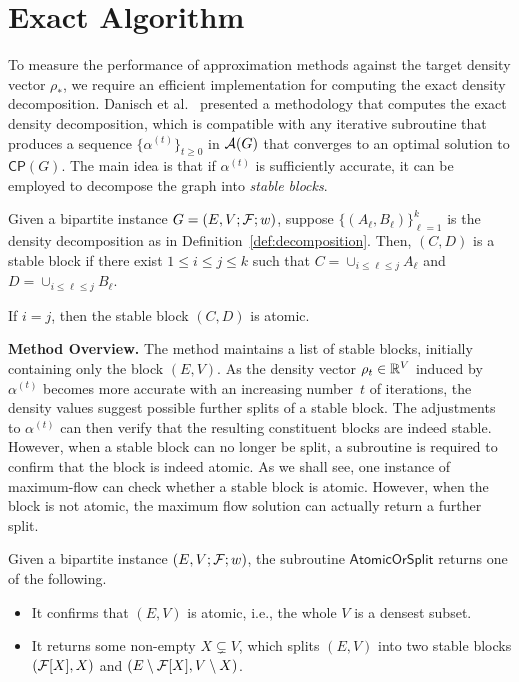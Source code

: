 \section{Exact Algorithm}
\label{sec:exact}

To measure the performance of approximation methods against the target density vector $\rho_*$, we require an efficient implementation for computing the exact density decomposition. Danisch et al.~\cite{DBLP:conf/www/DanischCS17} presented a methodology that computes the exact density decomposition, which is compatible with any iterative subroutine 
that produces a sequence $\{\alpha^{(t)}\}_{t \geq 0}$ in $\mathcal {A}(G)$
that converges to an optimal solution to $\mathsf{CP}(G)$.
The main idea is that if $\alpha^{(t)}$ is sufficiently accurate, it can be employed to decompose the graph into \emph{stable blocks}.



\begin{definition}\label{defn:stable-block}
Given a bipartite instance $G=(E, V; \mathcal {F}; w)$, suppose $\{(A_\ell, B_\ell)\}_{\ell = 1}^k$ is the density decomposition as in Definition~\ref{def:decomposition}. 
Then, $(C, D)$ is a stable block if
there exist $1 \leq i \leq j \leq k$ such that
$C = \cup_{i \leq \ell \leq j} A_\ell$
and $D = \cup_{i \leq \ell \leq j} B_\ell$.

If $i = j$, then the stable block $(C, D)$ is atomic.
\end{definition}


\noindent \textbf{Method Overview.}
The method maintains a list of stable blocks, initially containing only the block $(E, V)$. As the density vector $\rho_t \in \mathbb{R}^V$ induced by $\alpha^{(t)}$ becomes more accurate with an increasing number~$t$ of iterations, the density values suggest possible further splits of a stable block. The adjustments to $\alpha^{(t)}$ can then verify that the resulting constituent blocks are indeed stable. However, when a stable block can no longer be split, a subroutine is required to confirm that the block is indeed atomic.
As we shall see, one instance of maximum-flow can check whether a stable block is atomic. However,
when the block is not atomic, the maximum flow solution can actually return a further split.


\begin{definition}
\label{defn:atomicsplit}
Given a bipartite instance $(E, V; \mathcal {F}; w)$,
the subroutine $\mathsf{AtomicOrSplit}$ returns
one of the following.

\begin{itemize}

\item It confirms that $(E, V)$ is atomic, i.e., the whole $V$ is a densest subset.


\item It returns some non-empty $X \subsetneq V$,
which splits $(E,V)$ into two stable blocks $(\mathcal {F}[X], X)$
and $(E \setminus \mathcal {F}[X], V \setminus X)$.
\end{itemize}
\end{definition}


